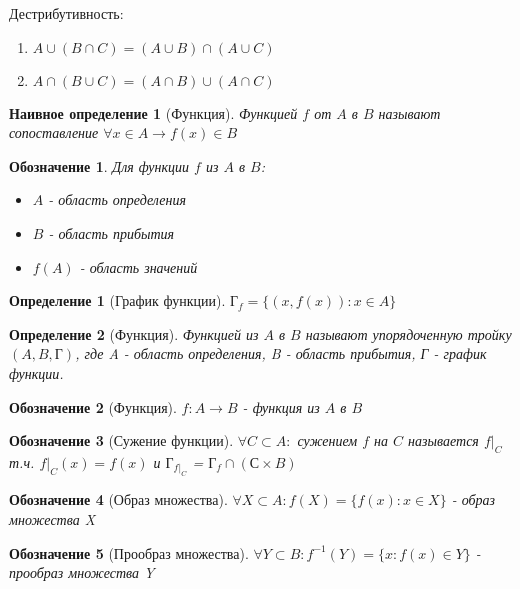 \documentclass[12pt, a4]{article}
\newtheorem*{definition}{Определение}
\newtheorem*{n_definition}{Наивное определение}
\newtheorem*{notation}{Обозначение}
\begin{document}
\bigskip

Дестрибутивность:
\begin{enumerate}
    \item \(A \cup (B \cap C) = (A \cup B) \cap (A \cup C) \)
    \item \(A \cap (B \cup C) = (A \cap B) \cup (A \cap C) \)
\end{enumerate}

\begin{n_definition}[Функция]
    Функцией $f$ от $A$ в $B$ называют сопоставление $\forall x \in A \to f(x) \in B$
\end{n_definition}

\begin{notation}
Для функции $f$ из $A$ в $B$:
\begin{itemize}
    \item $A$ - область определения
    \item $B$ - область прибытия
    \item $f(A)$ - область значений
\end{itemize}
\end{notation}

\begin{definition}[График функции]
 $Г_f = \{(x, f(x)) : x \in A\}$
\end{definition}

\begin{definition}[Функция]
 Функцией из $A$ в $B$ называют упорядоченную тройку $(A, B, Г)$, где A - область определения, B - область прибытия, Г - график функции.
\end{definition}

\begin{notation}[Функция] 
$f: A \to B$ - функция из $A$ в $B$
\end{notation}

\begin{notation}[Сужение функции]
 $\forall C \subset A:$ сужением $f$ на $C$ называется $f|_C$ т.ч.  $f|_C(x) = f(x)$  и $Г_{f|_C}$ = $Г_f \cap (С \times B) $
\end{notation}

\begin{notation}[Образ множества]
 $\forall X \subset A: f(X) = \{f(x) : x \in X\}$ - образ множества X
\end{notation}

\begin{notation}[Прообраз множества]
 $\forall Y \subset B: f^{-1}(Y) = \{x : f(x) \in Y\}$ - прообраз множества Y
\end{notation}
\end{document}
